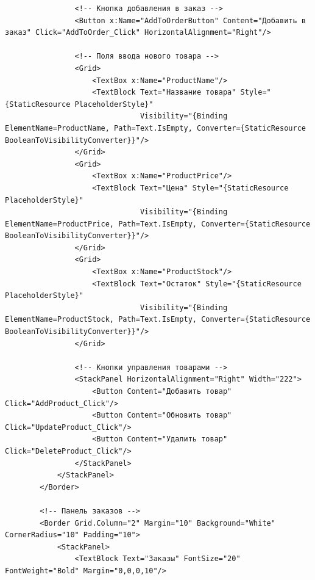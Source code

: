 \documentclass[12pt]{article}
\begin{document}
\begin{lstlisting}
                <!-- Кнопка добавления в заказ -->
                <Button x:Name="AddToOrderButton" Content="Добавить в заказ" Click="AddToOrder_Click" HorizontalAlignment="Right"/>

                <!-- Поля ввода нового товара -->
                <Grid>
                    <TextBox x:Name="ProductName"/>
                    <TextBlock Text="Название товара" Style="{StaticResource PlaceholderStyle}"
                               Visibility="{Binding ElementName=ProductName, Path=Text.IsEmpty, Converter={StaticResource BooleanToVisibilityConverter}}"/>
                </Grid>
                <Grid>
                    <TextBox x:Name="ProductPrice"/>
                    <TextBlock Text="Цена" Style="{StaticResource PlaceholderStyle}"
                               Visibility="{Binding ElementName=ProductPrice, Path=Text.IsEmpty, Converter={StaticResource BooleanToVisibilityConverter}}"/>
                </Grid>
                <Grid>
                    <TextBox x:Name="ProductStock"/>
                    <TextBlock Text="Остаток" Style="{StaticResource PlaceholderStyle}"
                               Visibility="{Binding ElementName=ProductStock, Path=Text.IsEmpty, Converter={StaticResource BooleanToVisibilityConverter}}"/>
                </Grid>

                <!-- Кнопки управления товарами -->
                <StackPanel HorizontalAlignment="Right" Width="222">
                    <Button Content="Добавить товар" Click="AddProduct_Click"/>
                    <Button Content="Обновить товар" Click="UpdateProduct_Click"/>
                    <Button Content="Удалить товар" Click="DeleteProduct_Click"/>
                </StackPanel>
            </StackPanel>
        </Border>

        <!-- Панель заказов -->
        <Border Grid.Column="2" Margin="10" Background="White" CornerRadius="10" Padding="10">
            <StackPanel>
                <TextBlock Text="Заказы" FontSize="20" FontWeight="Bold" Margin="0,0,0,10"/>


\end{lstlisting}
\end{document}
